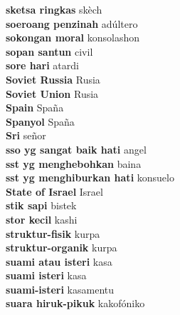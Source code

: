 \textbf{ sketsa ringkas  } skèch \\
\textbf{ soeroang penzinah  } adúltero \\
\textbf{ sokongan moral  } konsolashon \\
\textbf{ sopan santun  } civil \\
\textbf{ sore hari  } atardi \\
\textbf{ Soviet Russia  } Rusia \\
\textbf{ Soviet Union  } Rusia \\
\textbf{ Spain  } Spaña \\
\textbf{ Spanyol  } Spaña \\
\textbf{ Sri  } señor \\
\textbf{ sso yg sangat baik hati  } angel \\
\textbf{ sst yg menghebohkan  } baina \\
\textbf{ sst yg menghiburkan hati  } konsuelo \\
\textbf{ State of Israel  } Israel \\
\textbf{ stik sapi  } bistek \\
\textbf{ stor kecil  } kashi \\
\textbf{ struktur-fisik  } kurpa \\
\textbf{ struktur-organik  } kurpa \\
\textbf{ suami atau isteri  } kasa \\
\textbf{ suami isteri  } kasa \\
\textbf{ suami-isteri  } kasamentu \\
\textbf{ suara hiruk-pikuk  } kakofóniko \\
